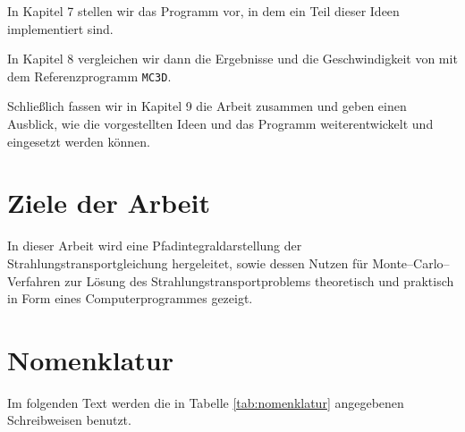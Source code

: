 	In Kapitel 7 stellen wir das Programm \pirate vor, in dem ein Teil dieser Ideen implementiert sind.
	
	In Kapitel 8 vergleichen wir dann die Ergebnisse und die Geschwindigkeit von \pirate mit dem Referenzprogramm \texttt{MC3D}.
	
	Schließlich fassen wir in Kapitel 9 die Arbeit zusammen und geben einen Ausblick, wie die vorgestellten Ideen und das Programm \pirate weiterentwickelt und eingesetzt werden können.

	\section{Ziele der Arbeit}
	In dieser Arbeit wird eine Pfadintegraldarstellung der Strahlungstransportgleichung hergeleitet, sowie dessen Nutzen für Monte--Carlo--Verfahren zur Lösung des Strahlungstransportproblems theoretisch und praktisch in Form eines Computerprogrammes gezeigt.
	
	\section{Nomenklatur}\label{subsec:nomenklatur}
	Im folgenden Text werden die in Tabelle \ref{tab:nomenklatur} angegebenen Schreibweisen benutzt.

